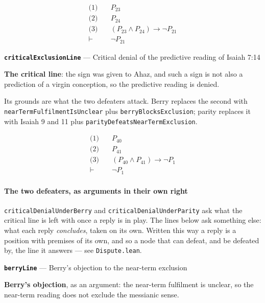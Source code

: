 \documentclass[11pt]{article}
\begin{document}
\begin{align*}
  \text{(1)} \quad & P_{23} \\
  \text{(2)} \quad & P_{24} \\
  \text{(3)} \quad & (P_{23} \land P_{24}) \rightarrow \lnot P_{21} \\
  \vdash \quad & \lnot P_{21}
\end{align*}
\par\medskip\noindent\textbf{\texttt{critical\allowbreak{}Exclusion\allowbreak{}Line}} --- Critical denial of the predictive reading of Isaiah 7:14\par\nobreak\noindent
\textbf{The critical line}: the sign was given to Ahaz, and such a sign is not also a prediction of a virgin conception, so the predictive reading is denied.

Its grounds are what the two defeaters attack. Berry replaces the second with \texttt{near\allowbreak{}Term\allowbreak{}Fulfilment\allowbreak{}Is\allowbreak{}Unclear} plus \texttt{berry\allowbreak{}Blocks\allowbreak{}Exclusion}; parity replaces it with Isaiah 9 and 11 plus \texttt{parity\allowbreak{}Defeats\allowbreak{}Near\allowbreak{}Term\allowbreak{}Exclusion}.

\begin{align*}
  \text{(1)} \quad & P_{40} \\
  \text{(2)} \quad & P_{41} \\
  \text{(3)} \quad & (P_{40} \land P_{41}) \rightarrow \lnot P_{1} \\
  \vdash \quad & \lnot P_{1}
\end{align*}
\paragraph*{The two defeaters, as arguments in their own right}
\leavevmode\par
\texttt{critical\allowbreak{}Denial\allowbreak{}Under\allowbreak{}Berry} and \texttt{critical\allowbreak{}Denial\allowbreak{}Under\allowbreak{}Parity} ask what the critical line is left with once a reply is in play. The lines below ask something else: what each reply \emph{concludes}, taken on its own. Written this way a reply is a position with premises of its own, and so a node that can defeat, and be defeated by, the line it answers — see \texttt{Dispute.lean}.

\par\medskip\noindent\textbf{\texttt{berry\allowbreak{}Line}} --- Berry's objection to the near-term exclusion\par\nobreak\noindent
\textbf{Berry's objection}, as an argument: the near-term fulfilment is unclear, so the near-term reading does not exclude the messianic sense.
\end{document}
